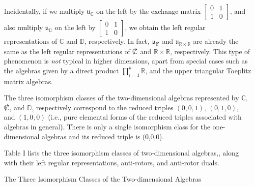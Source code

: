 \documentclass{amsart}
\theoremstyle{definition}
\numberwithin{theorem}{section}
\numberwithin{equation}{section}
\begin{document}
Incidentally, if we multiply $\mathfrak{u}_{\mathbb{C}}$ on the left by the exchange matrix $\left[\begin{array}{ccc}
 0 & 1   \\ 
 1 & 0    
\end{array}\right]$, and also multiply $\mathfrak{u}_{\mathbb{D}}$ on the left by $\left[\begin{array}{ccc}
 0 & 1   \\ 
 1 & 0    
\end{array}\right]$, we obtain the left regular representations of $\mathbb{C}$ and $\mathbb{D}$, respectively.   In fact, $\mathfrak{u}_{\slashed{\mathbb{C}}}$ and $\mathfrak{u}_{\mathbb{R}\times\mathbb{R}}$ are already the same as the left regular representations of $\slashed{\mathbb{C}}$ and $\mathbb{R}\times\mathbb{R}$, respectively.  This type of phenomenon is {\it not} typical in higher dimensions, apart from special cases such as the algebras given by a direct product $\prod_{i=1}^k \mathbb{R}$, and the upper triangular Toeplitz matrix algebras.

 The three isomorphism classes of the two-dimensional algebras represented by $\mathbb{C}$, $\slashed{\mathbb{C}}$, and $\mathbb{D}$, respectively correspond to the reduced triples  $(0,0,1)$, $(0,1,0)$, and $(1,0,0)$ (i.e., pure elemental forms of the reduced triples associated with algebras in general).  There is only a single isomorphism class for the one-dimensional algebras and its reduced triple is (0,0,0).
 
Table I lists the three isomorphism classes of two-dimensional algebras,, along with their left regular representations, anti-rotors, and anti-rotor duals. 

\vspace{1.5cm}

  \centerline{\large The Three Isomorphism Classes of the Two-dimensional Algebras } 

\vspace{.5cm}
\end{document}
